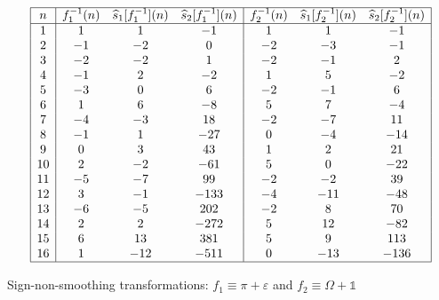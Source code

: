 \documentclass[12pt,reqno,a4letter]{article}
\numberwithin{figure}{section}
\numberwithin{table}{section}
\numberwithin{equation}{section}
\theoremstyle{plain}
\numberwithin{theorem}{section}
\theoremstyle{definition}
\begin{document}
\begin{table}[h!]
\begin{equation*}
\begin{array}{|c|ccc|ccc|} 
 \hline
 n & f_1^{-1}(n) & \widehat{s}_1[f_1^{-1}](n) & \widehat{s}_2[f_1^{-1}](n) & 
     f_2^{-1}(n) & \widehat{s}_1[f_2^{-1}](n) & 
     \widehat{s}_2[f_2^{-1}](n) \\ \hline
 1 & 1 & 1 & -1 & 1 & 1 & -1 \\
 2 & -1 & -2 & 0 & -2 & -3 & -1 \\
 3 & -2 & -2 & 1 & -2 & -1 & 2 \\
 4 & -1 & 2 & -2 & 1 & 5 & -2 \\
 5 & -3 & 0 & 6 & -2 & -1 & 6 \\
 6 & 1 & 6 & -8 & 5 & 7 & -4 \\
 7 & -4 & -3 & 18 & -2 & -7 & 11 \\
 8 & -1 & 1 & -27 & 0 & -4 & -14 \\
 9 & 0 & 3 & 43 & 1 & 2 & 21 \\
 10 & 2 & -2 & -61 & 5 & 0 & -22 \\
 11 & -5 & -7 & 99 & -2 & -2 & 39 \\
 12 & 3 & -1 & -133 & -4 & -11 & -48 \\
 13 & -6 & -5 & 202 & -2 & 8 & 70 \\
 14 & 2 & 2 & -272 & 5 & 12 & -82 \\
 15 & 6 & 13 & 381 & 5 & 9 & 113 \\
 16 & 1 & -12 & -511 & 0 & -13 & -136 \\
 \hline
\end{array}
\end{equation*}
\caption{Sign-non-smoothing transformations: $f_1 \equiv \pi + \varepsilon$ and $f_2 \equiv \Omega + \mathds{1}$}
\label{table_s12Hatfn_SignSmoothingTF_v3}
\end{table}
\end{document}
